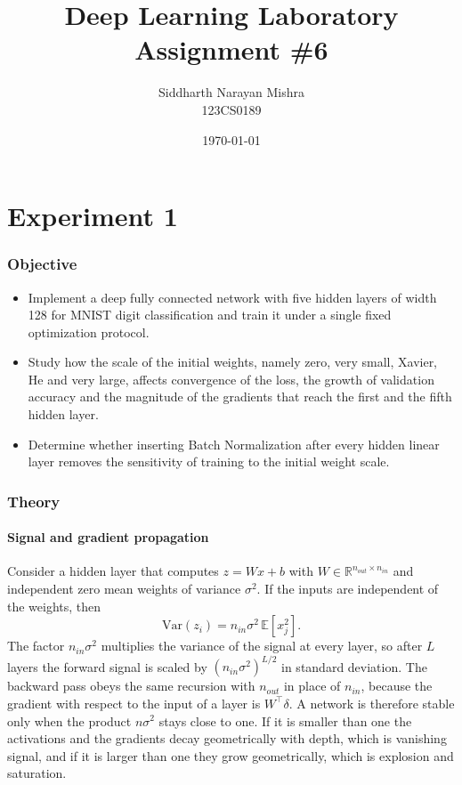 \documentclass[12pt]{article}
\title{
Deep Learning Laboratory\\
Assignment \#6
}
\author{
Siddharth Narayan Mishra\\
123CS0189
}
\date{\today}
\begin{document}
\maketitle

\tableofcontents

\newpage

\part*{Experiment 1}

\section{Objective}

\begin{itemize}
\item Implement a deep fully connected network with five hidden layers of width 128 for MNIST digit classification and train it under a single fixed optimization protocol.
\item Study how the scale of the initial weights, namely zero, very small, Xavier, He and very large, affects convergence of the loss, the growth of validation accuracy and the magnitude of the gradients that reach the first and the fifth hidden layer.
\item Determine whether inserting Batch Normalization after every hidden linear layer removes the sensitivity of training to the initial weight scale.
\end{itemize}

\section{Theory}

\subsection{Signal and gradient propagation}

Consider a hidden layer that computes $z = Wx + b$ with $W \in \mathbb{R}^{n_{out} \times n_{in}}$ and independent zero mean weights of variance $\sigma^2$. If the inputs are independent of the weights, then
\begin{equation}
\mathrm{Var}(z_i) = n_{in} \sigma^2 \, \mathbb{E}[x_j^2].
\end{equation}
The factor $n_{in}\sigma^2$ multiplies the variance of the signal at every layer, so after $L$ layers the forward signal is scaled by $(n_{in}\sigma^2)^{L/2}$ in standard deviation. The backward pass obeys the same recursion with $n_{out}$ in place of $n_{in}$, because the gradient with respect to the input of a layer is $W^{\top}\delta$. A network is therefore stable only when the product $n\sigma^2$ stays close to one. If it is smaller than one the activations and the gradients decay geometrically with depth, which is vanishing signal, and if it is larger than one they grow geometrically, which is explosion and saturation.
\end{document}

